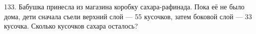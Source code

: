 133. Бабушка принесла из магазина коробку сахара-рафинада. Пока её не было дома, дети сначала съели верхний слой --- 55 кусочков, затем боковой слой --- 33 кусочка. Сколько кусочков сахара осталось?\\
